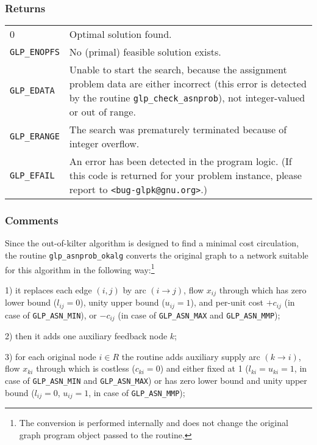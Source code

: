 \documentclass[dvipdfm,11pt]{report}
\begin{document}
\subsubsection*{Returns}

\def\arraystretch{1}

\begin{tabular}{@{}p{25mm}p{97.3mm}@{}}
0 & Optimal solution found.\\
\verb|GLP_ENOPFS| & No (primal) feasible solution exists.\\
\verb|GLP_EDATA| & Unable to start the search, because the assignment
problem data are either incorrect (this error is detected by the
routine \verb|glp_check_asnprob|), not integer-valued or out of range.\\
\verb|GLP_ERANGE| & The search was prematurely terminated because of
integer overflow.\\
\verb|GLP_EFAIL| & An error has been detected in the program logic.
(If this code is returned for your problem instance, please report to
\verb|<bug-glpk@gnu.org>|.)\\
\end{tabular}

\subsubsection*{Comments}

Since the out-of-kilter algorithm is designed to find a minimal cost
circulation, the routine \verb|glp_asnprob_okalg| converts the original
graph to a network suitable for this algorithm in the following
way:\footnote{The conversion is performed internally and does not change
the original graph program object passed to the routine.}

1) it replaces each edge $(i,j)$ by arc $(i\rightarrow j)$,
flow $x_{ij}$ through which has zero lower bound ($l_{ij}=0$), unity
upper bound ($u_{ij}=1$), and per-unit cost $+c_{ij}$ (in case of
\verb|GLP_ASN_MIN|), or $-c_{ij}$ (in case of \verb|GLP_ASN_MAX| and
\verb|GLP_ASN_MMP|);

2) then it adds one auxiliary feedback node $k$;

\newpage

3) for each original node $i\in R$ the routine adds auxiliary supply
arc $(k\rightarrow i)$, flow $x_{ki}$ through which is costless
($c_{ki}=0$) and either fixed at 1 ($l_{ki}=u_{ki}=1$, in case of
\verb|GLP_ASN_MIN| and \verb|GLP_ASN_MAX|) or has zero lower bound and
unity upper bound ($l_{ij}=0$, $u_{ij}=1$, in case of
\verb|GLP_ASN_MMP|);
\end{document}

